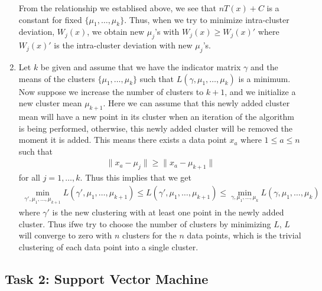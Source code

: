 \documentclass[a4paper,10pt]{article}
\theoremstyle{definition}
\begin{document}
\begin{enumerate}
From the relationship we establised above, we see that $nT(x) + C$ is a constant for fixed $\{\mu_1,\ldots, \mu_k\}$. Thus, when we try to minimize intra-cluster deviation, $W_j(x)$, we obtain new $\mu_j$'s with $W_j(x) \geq W_j(x)'$ where $W_j(x)'$ is the intra-cluster deviation with new $\mu_j$'s.


\item Let $k$ be given and assume that we have the indicator matrix $\gamma$ and the means of the clusters $\{\mu_1,\ldots,\mu_k\}$ such that $L(\gamma, \mu_1,\ldots, \mu_k)$ is a minimum. Now suppose we increase the number of clusters to $k+1$, and we initialize a new cluster mean $\mu_{k+1}$. Here we can assume that this newly added cluster mean will have a new point in its cluster when an iteration of the algorithm is being performed, otherwise, this newly added cluster will be removed the moment it is added. This means there exists a data point $x_a$ where $1\leq a \leq n$  such that 
\begin{align*}
\lVert x_a - \mu_j\rVert \geq \lVert x_a - \mu_{k+1}\rVert
\end{align*}
for all $j = 1, \ldots, k$. Thus this implies that we get 
\begin{align*}
\min_{\gamma', \mu_1, \ldots, \mu_{k+1}}L(\gamma', \mu_1, \ldots, \mu_{k+1}) \leq L(\gamma', \mu_1, \ldots, \mu_{k+1}) \leq \min_{\gamma, \mu_1, \ldots, \mu_{k}}L(\gamma, \mu_1, \ldots, \mu_{k}) 
\end{align*}
where $\gamma'$ is the new clustering with at least one point in the newly added cluster. Thus ifwe try to choose the number of clusters by minimizing $L$, $L$ will converge to zero with $n$ clusters for the $n$ data points, which is the trivial clustering of each data point into a single cluster. 

\end{enumerate}

\subsection*{Task 2: Support Vector Machine}
\end{document}

